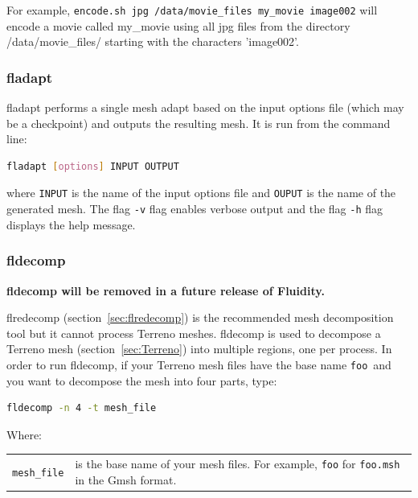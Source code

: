 For example, \texttt{encode.sh jpg /data/movie\_files my\_movie image002} will encode a movie called my\_movie using all jpg files from the directory /data/movie\_files/ starting with the characters 'image002'.



\subsubsection{fladapt}
\label{sec:fladapt}
fladapt performs a single mesh adapt based on the input options file (which may be a checkpoint) and outputs the resulting mesh. It is run from the command line:

\begin{lstlisting}[language = Bash]
fladapt [options] INPUT OUTPUT
\end{lstlisting}
where \lstinline[language = Bash]+INPUT+ is the name of the input options file and \lstinline[language = Bash]+OUPUT+ is the name of the generated mesh. The flag \lstinline[language = Bash]+-v+ flag enables verbose output and the flag \lstinline[language = Bash]+-h+ flag displays the help message.


\subsubsection{fldecomp}
\label{sec:fldecomp}

{\bf fldecomp will be removed in a future release of Fluidity.}

flredecomp (section~\ref{sec:flredecomp}) is the recommended mesh decomposition tool but it cannot process Terreno meshes.  fldecomp is used to decompose a Terreno mesh (section~\ref{sec:Terreno}) into multiple regions, one per
process. In order to run fldecomp, if your Terreno mesh files have the base name
\lstinline{foo}\ and you want to decompose the mesh into four parts, type:
\begin{lstlisting}[language = Bash]
fldecomp -n 4 -t mesh_file
\end{lstlisting}

Where:
\begin{center}
  \begin{tabular}{lp{}}
    \lstinline+mesh_file+ & is the base name of your mesh files. For
    example, \lstinline+foo+ for \lstinline+foo.msh+ in the Gmsh format.
  \end{tabular}
\end{center}

